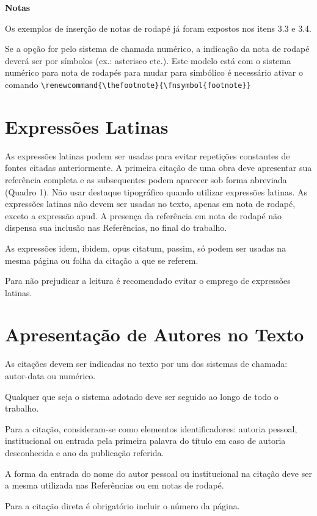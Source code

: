 \textbf{Notas}

Os exemplos de inserção de notas de rodap\'e j\'a foram expostos nos itens 3.3 e 3.4.

Se a opção for pelo sistema de chamada num\'erico, a indicação da nota de rodap\'e dever\'a ser por símbolos (ex.: asterisco etc.). 
Este modelo est\'a com o sistema num\'erico para nota de rodap\'es para mudar para simbólico \'e necess\'ario ativar o comando \verb+\renewcommand{\thefootnote}{\fnsymbol{footnote}}+

\section{Expressões Latinas}

As expressões latinas podem ser usadas para evitar repetições
constantes de fontes citadas anteriormente. A primeira citação de uma obra
deve apresentar sua refer\^encia completa e as subsequentes podem aparecer
sob forma abreviada (Quadro 1).
Não usar destaque tipogr\'afico quando utilizar expressões latinas.
As expressões latinas não devem ser usadas no texto, apenas em nota
de rodap\'e, exceto a expressão apud.
A presença da refer\^encia em nota de rodap\'e não dispensa sua inclusão
nas Refer\^encias, no final do trabalho.

As expressões idem, ibidem, opus citatum, passim, só podem ser usadas na mesma p\'agina ou folha da citação a que se referem.

Para não prejudicar a leitura \'e recomendado evitar o emprego de
expressões latinas.


\section{Apresentação de Autores no Texto}

As citações devem ser indicadas no texto por um dos sistemas de chamada: autor-data ou num\'erico.

Qualquer que seja o sistema adotado deve ser seguido ao longo de todo o trabalho. 

Para a citação, consideram-se como elementos identificadores: autoria pessoal, institucional ou entrada pela primeira palavra do título em caso de autoria desconhecida e ano da publicação referida.

A forma da entrada do nome do autor pessoal ou institucional na citação deve ser a mesma utilizada nas Refer\^encias ou em notas de rodap\'e.

Para a citação direta \'e obrigatório incluir o número da p\'agina.

